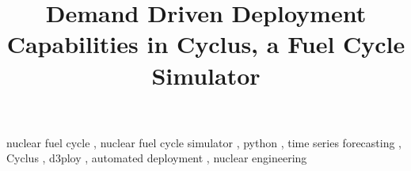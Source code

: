 \documentclass[review]{elsarticle}
\begin{document}
\begin{frontmatter}
\title{Demand Driven Deployment Capabilities in Cyclus, a Fuel Cycle Simulator}

\date{}                     %




	
\begin{keyword}
nuclear fuel cycle \sep
nuclear fuel cycle simulator \sep
python \sep 
time series forecasting \sep 
Cyclus \sep 
d3ploy \sep 
automated deployment \sep 
nuclear engineering
\end{keyword}


\end{frontmatter}
\glsresetall

\linenumbers


\FloatBarrier

\FloatBarrier

 
\FloatBarrier

\FloatBarrier

\FloatBarrier

\FloatBarrier


\end{document}
